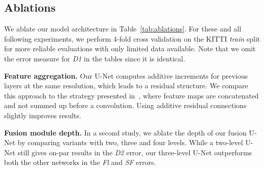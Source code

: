 \documentclass[10pt,twocolumn,letterpaper]{article}
\begin{document}
\subsection{Ablations}

We ablate our model architecture in Table~\ref{tab:ablations}.
For these and all following experiments, we perform 4-fold cross validation on the KITTI \emph{train} split for more reliable evaluations with only limited data available.
Note that we omit the error measure for \emph{D1} in the tables since it is identical.

\vspace{1cm}
\medskip
\noindent
\textbf{Feature aggregation.}
Our U-Net computes additive increments for previous layers at the same resolution, which leads to a residual structure.
We compare this approach to the 
strategy presented in~\cite{Ronneberger2015_UNet},
where feature maps are concatenated and not summed up before a convolution.
Using additive residual connections slightly improves results.

\medskip
\noindent
\textbf{Fusion module depth.}
In a second study, we ablate the depth of our fusion U-Net by comparing variants with two, three and four levels.
While a two-level U-Net still gives on-par results in the \emph{D2} error, our three-level U-Net 
outperforms both the other networks 
in the \emph{Fl} and \emph{SF} errors.
\end{document}
